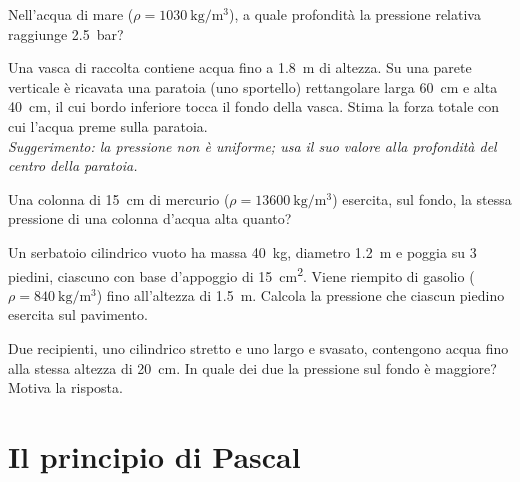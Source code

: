 \begin{esercizio}
Nell'acqua di mare ($\rho = \SI{1030}{\kilo\gram\per\metre\cubed}$), a quale profondità la pressione relativa raggiunge \SI{2,5}{\bar}?\\
\end{esercizio}

\begin{esercizio}
Una vasca di raccolta contiene acqua fino a \SI{1,8}{\metre} di altezza. Su una parete verticale è ricavata una paratoia (uno sportello) rettangolare larga \SI{60}{\centi\metre} e alta \SI{40}{\centi\metre}, il cui bordo inferiore tocca il fondo della vasca. Stima la forza totale con cui l'acqua preme sulla paratoia. \\
\textit{Suggerimento: la pressione non è uniforme; usa il suo valore alla profondità del centro della paratoia.}\\
\end{esercizio}

\begin{esercizio}
Una colonna di \SI{15}{\centi\metre} di mercurio ($\rho = \SI{13600}{\kilo\gram\per\metre\cubed}$) esercita, sul fondo, la stessa pressione di una colonna d'acqua alta quanto? \\
\end{esercizio}

\begin{esercizio}
Un serbatoio cilindrico vuoto ha massa \SI{40}{\kilo\gram}, diametro \SI{1,2}{\metre} e poggia su 3 piedini, ciascuno con base d'appoggio di \SI{15}{\centi\metre\squared}. Viene riempito di gasolio ($\rho = \SI{840}{\kilo\gram\per\metre\cubed}$) fino all'altezza di \SI{1,5}{\metre}. Calcola la pressione che ciascun piedino esercita sul pavimento.\\
\end{esercizio}

\begin{esercizio}
Due recipienti, uno cilindrico stretto e uno largo e svasato, contengono acqua fino alla stessa altezza di \SI{20}{\centi\metre}. In quale dei due la pressione sul fondo è maggiore? Motiva la risposta.\\
\end{esercizio}


\section{Il principio di Pascal}

